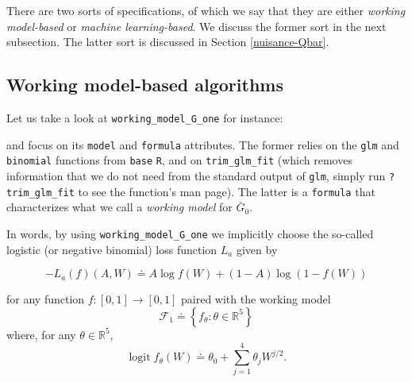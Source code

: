 \documentclass[11pt,openright,twoside]{book}
\newenvironment{Shaded}{\begin{snugshade}}{\end{snugshade}}
\newcommand{\CommentTok}[1]{\textcolor[rgb]{0.56,0.35,0.01}{\textit{#1}}}
\newcommand{\NormalTok}[1]{#1}
\DeclareMathOperator{\logit}{logit}
\newcommand{\bbR}{\mathbb{R}}
\newcommand{\defq}{\doteq}
\newcommand{\calF}{\mathcal{F}}
\newcommand{\Gbar}{\bar{G}}
\theoremstyle{definition}
\theoremstyle{definition}
\theoremstyle{definition}
\theoremstyle{remark}
\begin{document}
There are two sorts of specifications, of which we say that they are either
\emph{working model-based} or \emph{machine learning-based}. We discuss the former sort
in the next subsection. The latter sort is discussed in Section
\ref{nuisance-Qbar}.

\hypertarget{logis-loss}{%
\subsection{Working model-based algorithms}\label{logis-loss}}


Let us take a look at \texttt{working\_model\_G\_one} for instance:

\begin{Shaded}
\end{Shaded}

and focus on its \texttt{model} and \texttt{formula} attributes. The former relies on the
\texttt{glm} and \texttt{binomial} functions from \texttt{base} \texttt{R}, and on \texttt{trim\_glm\_fit} (which
removes information that we do not need from the standard output of \texttt{glm},
simply run \texttt{?trim\_glm\_fit} to see the function's man page). The latter is a
\texttt{formula} that characterizes what we call a \emph{working model} for \(\Gbar_{0}\).

In words, by using \texttt{working\_model\_G\_one} we implicitly choose the so-called
logistic (or negative binomial) loss function \(L_{a}\) given by

\begin{equation} 
\label{eq:logis-loss} -L_{a}(f)(A,W) \defq A \log f(W) + (1 - A)
\log (1 - f(W)) 
\end{equation}

for any function \(f : [0,1] \to [0,1]\) paired with the working model
\begin{equation*}   \calF_{1}   \defq    \left\{f_{\theta}   :   \theta   \in
\bbR^{5}\right\}  \end{equation*} where, for any \(\theta \in \bbR^{5}\),
\begin{equation*}\logit  f_{\theta}  (W)  \defq \theta_{0}  +  \sum_{j=1}^{4}
\theta_{j} W^{j/2}.\end{equation*}
\end{document}
